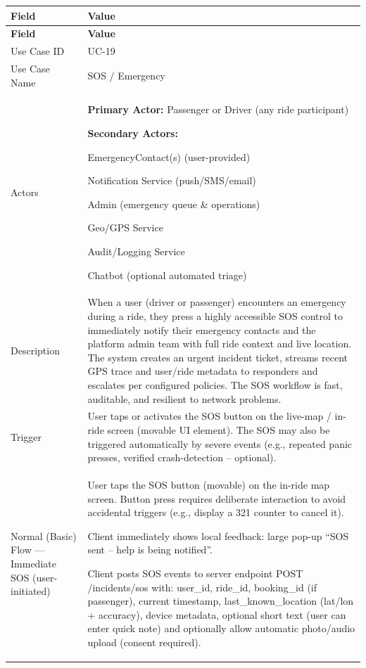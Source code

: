 \begin{longtable}{|p{3.5cm}|p{12cm}|}
\hline
\rowcolor{lightgray!30}
\textbf{Field} & \textbf{Value} \\
\hline
\endfirsthead
\hline
\rowcolor{lightgray!30}
\textbf{Field} & \textbf{Value} \\
\hline
\endhead
\hline
\endfoot
Use Case ID & UC-19 \\
\hline
Use Case Name & SOS / Emergency \\
\hline
Actors &
\textbf{Primary Actor:} Passenger or Driver (any ride participant)

\textbf{Secondary Actors:}

EmergencyContact(s) (user-provided)

Notification Service (push/SMS/email)

Admin (emergency queue \& operations)

Geo/GPS Service

Audit/Logging Service

Chatbot (optional automated triage) \\
\hline
Description &
When a user (driver or passenger) encounters an emergency during a ride, they press a highly accessible SOS control to immediately notify their emergency contacts and the platform admin team with full ride context and live location. The system creates an urgent incident ticket, streams recent GPS trace and user/ride metadata to responders and escalates per configured policies. The SOS workflow is fast, auditable, and resilient to network problems. \\
\hline
Trigger &
User taps or activates the SOS button on the live-map / in-ride screen (movable UI element). The SOS may also be triggered automatically by severe events (e.g., repeated panic presses, verified crash-detection – optional). \\
\hline
Normal (Basic) Flow — Immediate SOS (user-initiated) &
User taps the SOS button (movable) on the in-ride map screen. Button press requires deliberate interaction to avoid accidental triggers (e.g., display a 321 counter to cancel it).

Client immediately shows local feedback: large pop-up “SOS sent – help is being notified”.

Client posts SOS events to server endpoint POST /incidents/sos with: user\_id, ride\_id, booking\_id (if passenger), current timestamp, last\_known\_location (lat/lon + accuracy), device metadata, optional short text (user can enter quick note) and optionally allow automatic photo/audio upload (consent required).


\end{longtable}
